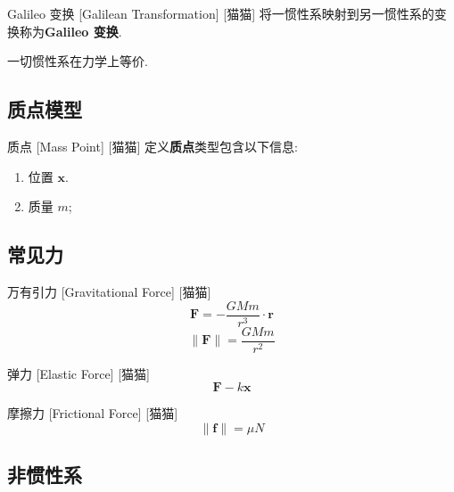 \documentclass[UTF8]{ctexart}
\begin{document}
        \begin{axm}
            []
            {Galileo 变换}
            [Galilean Transformation]
            [猫猫]
            将一惯性系映射到另一惯性系的变换称为\textbf{Galileo 变换}. 

            一切惯性系在力学上等价. 
        \end{axm}

    \subsection{质点模型}
        
        \begin{str}
            {质点}
            [Mass Point]
            [猫猫]
            定义\textbf{质点}类型包含以下信息: 
            \begin{enumerate}
                \item 位置 \(\bm{x}\). 
                \item 质量 \(m\); 
            \end{enumerate}
        \end{str}

    \subsection{常见力}
        
        \begin{axm}
            []
            {万有引力}
            [Gravitational Force]
            [猫猫]
            \[\bm{F}=-\frac{GMm}{r^3}\cdot\bm{r}\]
            \[\|\bm{F}\|=\frac{GMm}{r^2}\]
        \end{axm}
        
        \begin{axm}
            []
            {弹力}
            [Elastic Force]
            [猫猫]
            \[\bm{F}-k\bm{x}\]
        \end{axm}
        
        \begin{axm}
            []
            {摩擦力}
            [Frictional Force]
            [猫猫]
            \[\|\bm{f}\|=\mu N\]
        \end{axm}

    \subsection{非惯性系}
\end{document}
